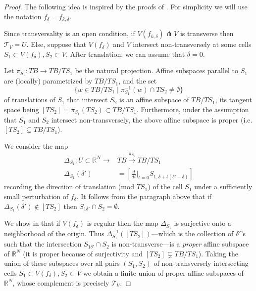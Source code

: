 \documentclass[10pt]{amsart}
\theoremstyle{definition}
\theoremstyle{remark}
\def\R{\mathbb{R}}
\newcommand{\mcal}{\mathcal}
\begin{document}
\begin{proof}
    The following idea is inspired by the proofs of 
    \cite[Lemma 3.24, Lemma 3.27]{sheridan2021lagrangian}. 
    For simplicity we will use the notation $f_\delta = f_{k,\delta}$.

    Since transversality is an open condition, if $V(f_{k,\delta}) \pitchfork V$ is transverse then  $\mcal T_V = U$.
    Else,  suppose that $V(f_\delta)$ and $V$ intersect non-transversely at some cells $S_1 \subset V(f_\delta), S_2 \subset V$.
    After translation, we can assume that $\delta= 0$.
    
    Let $\pi_{S_1}:TB \to TB/TS_1$ be the natural projection.
    Affine subspaces parallel to $S_1$ are (locally) parametrized by $TB/TS_1$, and the  set
    $$
        \{ w \in TB/TS_1 \mid \pi_{S_1}^{-1}(w) \cap TS_2 \neq \emptyset\}
    $$
    of translations of $S_1$ that intersect $S_2$ is an affine subspace of $TB/TS_1$, its tangent space being $[TS_2]=\pi_{S_1}(TS_2) \subset TB/TS_1$.
    Furthermore, under the assumption that $S_1$ and $S_2$ intersect non-transversely, the above affine subspace is proper (i.e. $[TS_2] \subsetneq TB/TS_1$).

    We consider the  map
    \begin{align*}
        \Delta_{S_1}: U\subset \R^N \to &TB \xrightarrow{\pi_{S_1}} TB/TS_1\\
        \Delta_{S_1}(\delta') &=\left\lbrack \frac{d}{dt} \bigg|_{t=0}S_{1,\delta+t(\delta'-\delta)}\right\rbrack
    \end{align*}
    recording the direction of translation (mod $TS_1$) of the cell $S_1$ under a sufficiently small perturbation  of $f_\delta$.
    It follows from the paragraph above that if $\Delta_{S_1}(\delta') \notin [TS_2]$ then $S_{1\delta'} \cap S_2 = \emptyset$.

    We show in  that if $V(f_\delta)$ is regular then the map $\Delta_{S_1}$ is surjective onto a neighborhood of the origin.
    Thus $\Delta_{S_1}^{-1}([TS_2])$---which is the collection of $\delta'$'s such that the intersection $S_{1\delta'} \cap S_2$ is non-transverse---is a \emph{proper} affine subspace of $\R^N$ (it is proper because of surjectivity and  $[TS_2] \subsetneq TB/TS_1$).
    Taking the union of these subspaces over all pairs $(S_1,S_2)$ of non-transversely intersecting cells $S_1\subset V(f_\delta), S_2 \subset V$ we obtain a finite union of proper affine subspaces of $\R^{N}$, whose complement is precisely $\mathcal T_{V}$.
\end{proof}
\end{document}
